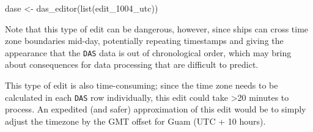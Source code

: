 \documentclass[
]{book}
\newenvironment{Shaded}{\begin{snugshade}}{\end{snugshade}}
\newcommand{\DecValTok}[1]{\textcolor[rgb]{0.00,0.00,0.81}{#1}}
\newcommand{\FunctionTok}[1]{\textcolor[rgb]{0.00,0.00,0.00}{#1}}
\newcommand{\NormalTok}[1]{#1}
\newcommand{\OtherTok}[1]{\textcolor[rgb]{0.56,0.35,0.01}{#1}}
\newcommand{\SpecialCharTok}[1]{\textcolor[rgb]{0.00,0.00,0.00}{#1}}
\newcommand{\StringTok}[1]{\textcolor[rgb]{0.31,0.60,0.02}{#1}}
\begin{document}
\begin{Shaded}
\begin{Highlighting}[]
\NormalTok{dase }\OtherTok{\textless{}{-}} \FunctionTok{das\_editor}\NormalTok{(}\FunctionTok{list}\NormalTok{(edit\_1004\_utc))}
\end{Highlighting}
\end{Shaded}

\begin{Shaded}
\end{Shaded}

Note that this type of edit can be dangerous, however, since ships can cross time zone boundaries mid-day, potentially repeating timestamps and giving the appearance that the \texttt{DAS} data is out of chronological order, which may bring about consequences for data processing that are difficult to predict.

This type of edit is also time-consuming; since the time zone needs to be calculated in each \texttt{DAS} row individually, this edit could take \textgreater20 minutes to process. An expedited (and safer) approximation of this edit would be to simply adjust the timezone by the GMT offset for Guam (UTC + 10 hours).
\end{document}
